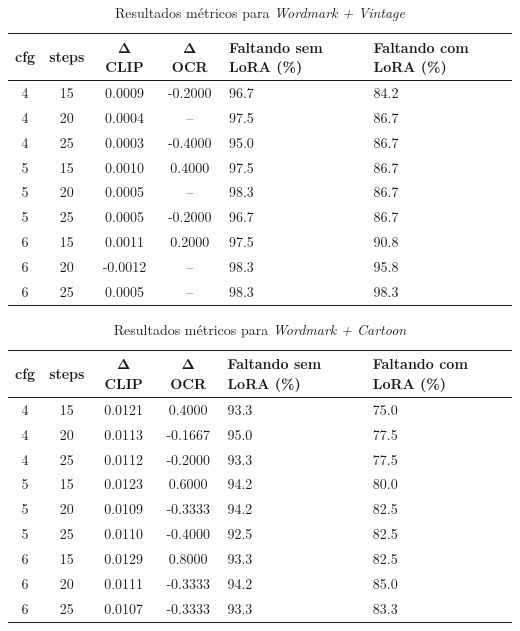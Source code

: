 \documentclass[12pt, %
openright, 
oneside, %
a4paper,    %
brazil]{facom-ufu-abntex2}
\begin{document}
\begin{table}[H]
\centering
\small
\setlength{\tabcolsep}{4pt}
\begin{tabularx}{\linewidth}{|c|c|c|c|X|X|}
\hline
\textbf{cfg} & \textbf{steps} & \(\boldsymbol{\Delta}\) \textbf{CLIP} & \(\boldsymbol{\Delta}\) \textbf{OCR} & \textbf{Faltando sem LoRA (\%)} & \textbf{Faltando com LoRA (\%)} \\ \hline
4 & 15 & 0.0009 & -0.2000 & 96.7 & 84.2 \\ \hline
4 & 20 & 0.0004 & --      & 97.5 & 86.7 \\ \hline
4 & 25 & 0.0003 & -0.4000 & 95.0 & 86.7 \\ \hline
5 & 15 & 0.0010 & 0.4000  & 97.5 & 86.7 \\ \hline
5 & 20 & 0.0005 & --      & 98.3 & 86.7 \\ \hline
5 & 25 & 0.0005 & -0.2000 & 96.7 & 86.7 \\ \hline
6 & 15 & 0.0011 & 0.2000  & 97.5 & 90.8 \\ \hline
6 & 20 & -0.0012& --      & 98.3 & 95.8 \\ \hline
6 & 25 & 0.0005 & --      & 98.3 & 98.3 \\ \hline
\end{tabularx}
\caption{Resultados métricos para \textit{Wordmark + Vintage}}
\label{tab:metrics_wm_vintage}
\end{table}

\begin{table}[H]
\centering
\small
\setlength{\tabcolsep}{4pt}
\begin{tabularx}{\linewidth}{|c|c|c|c|X|X|}
\hline
\textbf{cfg} & \textbf{steps} & \(\boldsymbol{\Delta}\) \textbf{CLIP} & \(\boldsymbol{\Delta}\) \textbf{OCR} & \textbf{Faltando sem LoRA (\%)} & \textbf{Faltando com LoRA (\%)} \\ \hline
4 & 15 & 0.0121 & 0.4000  & 93.3 & 75.0 \\ \hline
4 & 20 & 0.0113 & -0.1667 & 95.0 & 77.5 \\ \hline
4 & 25 & 0.0112 & -0.2000 & 93.3 & 77.5 \\ \hline
5 & 15 & 0.0123 & 0.6000  & 94.2 & 80.0 \\ \hline
5 & 20 & 0.0109 & -0.3333 & 94.2 & 82.5 \\ \hline
5 & 25 & 0.0110 & -0.4000 & 92.5 & 82.5 \\ \hline
6 & 15 & 0.0129 & 0.8000  & 93.3 & 82.5 \\ \hline
6 & 20 & 0.0111 & -0.3333 & 94.2 & 85.0 \\ \hline
6 & 25 & 0.0107 & -0.3333 & 93.3 & 83.3 \\ \hline
\end{tabularx}
\caption{Resultados métricos para \textit{Wordmark + Cartoon}}
\label{tab:metrics_wm_cartoon}
\end{table}
\end{document}
